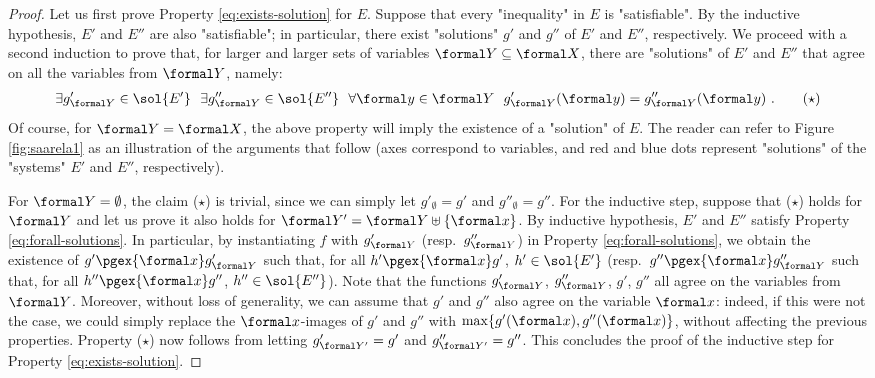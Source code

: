 \documentclass{theoretics}
\begin{document}
\begin{proof}
Let us first prove Property \eqref{eq:exists-solution} for $E$.
Suppose that every "inequality" in $E$ is "satisfiable".
By the inductive hypothesis, $E'$ and $E''$ are also "satisfiable";
in particular, there exist "solutions" $g'$ and $g''$ of $E'$ and $E''$, respectively.
We proceed with a second induction to prove that, for larger and larger
sets of variables $\formal Y\subseteq\formal X$, there are "solutions"
of $E'$ and $E''$ that agree on all the variables from $\formal Y$, namely:
\begin{align*}
  \exists g'_{\formal Y}\in\sol{E'} ~~
  \exists g''_{\formal Y}\in\sol{E''} ~~
  \forall \formal y\in \formal Y ~~
  g'_{\formal Y}(\formal y) = g''_{\formal Y}(\formal y) \ .
  \tag{$\star$}
\end{align*}
Of course, for $\formal Y=\formal X$, the above property will imply 
the existence of a "solution" of $E$.
The reader can refer to Figure \ref{fig:saarela1} as an illustration 
of the arguments that follow (axes correspond to variables, and red 
and blue dots represent "solutions" of the "systems" $E'$ and $E''$,
respectively).

For $\formal Y=\emptyset$, the claim ($\star$) is trivial, 
since we can simply let $g'_\emptyset = g'$ and $g''_\emptyset = g''$.
For the inductive step, suppose that ($\star$) holds for $\formal Y$
and let us prove it also holds for $\formal Y' = \formal Y \uplus \{\formal x\}$. 
By inductive hypothesis, $E'$ and $E''$ satisfy Property \eqref{eq:forall-solutions}.
In particular, by instantiating $f$ with $g'_{\formal Y}$ (resp.~$g''_{\formal Y}$)
in Property \eqref{eq:forall-solutions}, 
we obtain the existence of $g' \pgex{\formal x} g'_{\formal Y}$ such that, 
for all $h' \pgex{\formal x} g'$, $h'\in\sol{E'}$
(resp.~$g'' \pgex{\formal x} g''_{\formal Y}$ such that, 
for all $h'' \pgex{\formal x} g''$, $h''\in\sol{E''}$). 
Note that the functions $g'_{\formal Y}$, $g''_{\formal Y}$, $g'$, $g''$ 
all agree on the variables from $\formal Y$.
Moreover, without loss of generality, we can assume that $g'$ and $g''$ also agree
on the variable $\formal x$: indeed, if this were not the case, we could simply 
replace the $\formal x$-images of $g'$ and $g''$ with $\max\{g'(\formal x),g''(\formal x)\}$,
without affecting the previous properties.
Property ($\star$) now follows from letting $g'_{\formal Y'} = g'$ and $g''_{\formal Y'} = g''$.
This concludes the proof of the inductive step for Property \eqref{eq:exists-solution}.


\end{proof}
\end{document}
